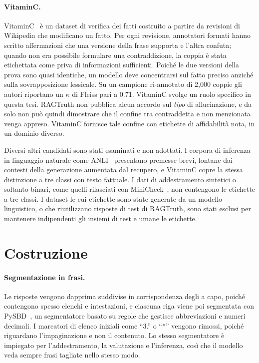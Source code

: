 \paragraph{VitaminC.} VitaminC~\cite{schuster2021vitaminc,hf_vitaminc} è un dataset di verifica dei fatti costruito a
partire da revisioni di Wikipedia che modificano un fatto. Per ogni revisione, annotatori formati hanno scritto
affermazioni che una versione della frase supporta e l'altra confuta; quando non era possibile formulare una
contraddizione, la coppia è stata etichettata come priva di informazioni sufficienti. Poiché le due versioni della prova
sono quasi identiche, un modello deve concentrarsi sul fatto preciso anziché sulla sovrapposizione lessicale. Su un
campione ri-annotato di 2{,}000 coppie gli autori riportano un $\kappa$ di Fleiss pari a 0.71. VitaminC svolge un ruolo
specifico in questa tesi. RAGTruth non pubblica alcun accordo sul \emph{tipo} di allucinazione, e da solo non può
quindi dimostrare che il confine tra contraddetta e non menzionata venga appreso. VitaminC fornisce tale confine con
etichette di affidabilità nota, in un dominio diverso.

Diversi altri candidati sono stati esaminati e non adottati. I corpora di inferenza in linguaggio naturale come
ANLI~\cite{nie2020anli} presentano premesse brevi, lontane dai contesti della generazione aumentata dal recupero, e
VitaminC copre la stessa distinzione a tre classi con testo fattuale. I dati di addestramento sintetici o soltanto
binari, come quelli rilasciati con MiniCheck~\cite{tang2024minicheck}, non contengono le etichette a tre classi. I
dataset le cui etichette sono state generate da un modello linguistico, o che riutilizzano risposte di test di RAGTruth,
sono stati esclusi per mantenere indipendenti gli insiemi di test e umane le etichette.

\section{Costruzione}
\label{sec:data-construction}

\paragraph{Segmentazione in frasi.} Le risposte vengono dapprima suddivise in corrispondenza degli a capo, poiché
contengono spesso elenchi e intestazioni, e ciascuna riga viene poi segmentata con PySBD~\cite{sadvilkar2020pysbd}, un
segmentatore basato su regole che gestisce abbreviazioni e numeri decimali. I marcatori di elenco iniziali come ``3.'' o
``*'' vengono rimossi, poiché riguardano l'impaginazione e non il contenuto. Lo stesso segmentatore è impiegato per
l'addestramento, la valutazione e l'inferenza, così che il modello veda sempre frasi tagliate nello stesso modo.

